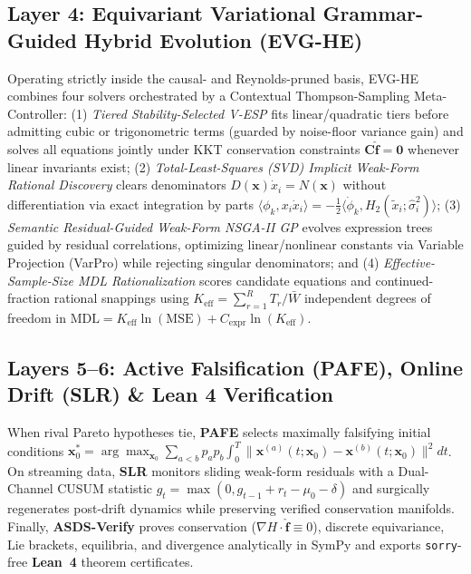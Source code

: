 \documentclass[10pt]{article} %
\begin{document}
\subsection{Layer 4: Equivariant Variational Grammar-Guided Hybrid Evolution (EVG-HE)}
Operating strictly inside the causal- and Reynolds-pruned basis, EVG-HE combines four solvers orchestrated by a Contextual Thompson-Sampling Meta-Controller:
(1) \emph{Tiered Stability-Selected V-ESP} fits linear/quadratic tiers before admitting cubic or trigonometric terms (guarded by noise-floor variance gain) and solves all equations jointly under KKT conservation constraints $\mathbf{C}\hat{\mathbf{f}} = \mathbf{0}$ whenever linear invariants exist;
(2) \emph{Total-Least-Squares (SVD) Implicit Weak-Form Rational Discovery} clears denominators $D(\mathbf{x})\dot{x}_i = N(\mathbf{x})$ without differentiation via exact integration by parts $\langle \phi_k, x_i \dot{x}_i \rangle = -\frac{1}{2}\langle \dot{\phi}_k, H_2(\tilde{x}_i; \hat{\sigma}_i^2) \rangle$;
(3) \emph{Semantic Residual-Guided Weak-Form NSGA-II GP} evolves expression trees guided by residual correlations, optimizing linear/nonlinear constants via Variable Projection (VarPro) while rejecting singular denominators; and
(4) \emph{Effective-Sample-Size MDL Rationalization} scores candidate equations and continued-fraction rational snappings using $K_{\text{eff}} = \sum_{r=1}^R T_r / \bar{W}$ independent degrees of freedom in $\text{MDL} = K_{\text{eff}}\ln(\text{MSE}) + C_{\text{expr}}\ln(K_{\text{eff}})$.

\subsection{Layers 5--6: Active Falsification (PAFE), Online Drift (SLR) \& Lean 4 Verification}
When rival Pareto hypotheses tie, \textbf{PAFE} selects maximally falsifying initial conditions $\mathbf{x}_0^* = \arg\max_{\mathbf{x}_0}\sum_{a<b} p_a p_b \int_0^T \|\mathbf{x}^{(a)}(t;\mathbf{x}_0) - \mathbf{x}^{(b)}(t;\mathbf{x}_0)\|^2 dt$. On streaming data, \textbf{SLR} monitors sliding weak-form residuals with a Dual-Channel CUSUM statistic $g_t = \max(0, g_{t-1} + r_t - \mu_0 - \delta)$ and surgically regenerates post-drift dynamics while preserving verified conservation manifolds. Finally, \textbf{ASDS-Verify} proves conservation ($\nabla H\cdot\hat{\mathbf{f}}\equiv 0$), discrete equivariance, Lie brackets, equilibria, and divergence analytically in SymPy and exports \texttt{sorry}-free \textbf{Lean~4} theorem certificates.
\end{document}
